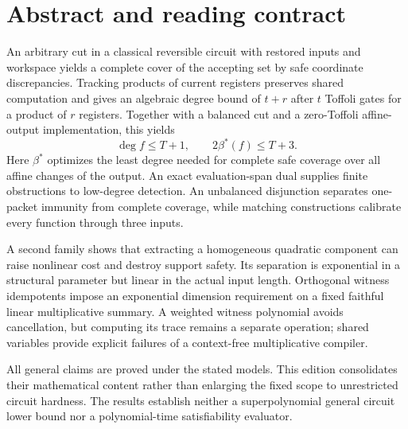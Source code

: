 \documentclass[11pt,letterpaper,oneside]{report}
\theoremstyle{komorebi}
\begin{document}
\KomorebiCover
{}


\hypersetup{pageanchor=false}

\hypersetup{pageanchor=true}
\chapter*{Abstract and reading contract}
An arbitrary cut in a classical reversible circuit with restored inputs and workspace yields a complete cover of the accepting set by safe coordinate discrepancies. Tracking products of current registers preserves shared computation and gives an algebraic degree bound of $t+r$ after $t$ Toffoli gates for a product of $r$ registers. Together with a balanced cut and a zero-Toffoli affine-output implementation, this yields
\[
\deg f\le T+1,\qquad 2\beta^*(f)\le T+3.
\]
Here $\beta^*$ optimizes the least degree needed for complete safe coverage over all affine changes of the output. An exact evaluation-span dual supplies finite obstructions to low-degree detection. An unbalanced disjunction separates one-packet immunity from complete coverage, while matching constructions calibrate every function through three inputs.

A second family shows that extracting a homogeneous quadratic component can raise nonlinear cost and destroy support safety. Its separation is exponential in a structural parameter but linear in the actual input length. Orthogonal witness idempotents impose an exponential dimension requirement on a fixed faithful linear multiplicative summary. A weighted witness polynomial avoids cancellation, but computing its trace remains a separate operation; shared variables provide explicit failures of a context-free multiplicative compiler.

All general claims are proved under the stated models. This edition consolidates their mathematical content rather than enlarging the fixed scope to unrestricted circuit hardness. The results establish neither a superpolynomial general circuit lower bound nor a polynomial-time satisfiability evaluator.
\end{document}
